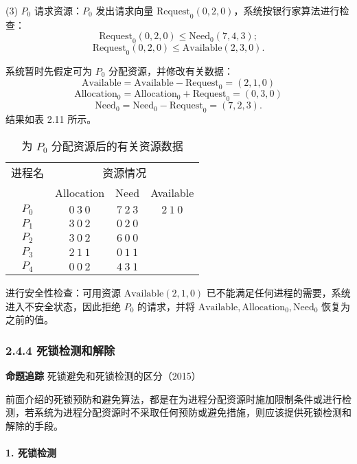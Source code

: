 \documentclass{ctexbook}
\begin{document}
		(3) $P_0$ 请求资源：$P_0$ 发出请求向量 $\text{Request}_0(0, 2, 0)$，系统按银行家算法进行检查：
		\[ 
		\text{Request}_0(0, 2, 0) \leq \text{Need}_0(7, 4, 3);
		\]
		\[ 
		\text{Request}_0(0, 2, 0) \leq \text{Available}(2, 3, 0).
		\]
		
		系统暂时先假定可为 $P_0$ 分配资源，并修改有关数据：
		\[ 
		\text{Available} = \text{Available} - \text{Request}_0 = (2, 1, 0)
		\]
		\[ 
		\text{Allocation}_0 = \text{Allocation}_0 + \text{Request}_0 = (0, 3, 0)
		\]
		\[ 
		\text{Need}_0 = \text{Need}_0 - \text{Request}_0 = (7, 2, 3).
		\]
		结果如表 2.11 所示。
		
		\begin{table}[h]
			\centering
			\caption{为 $P_0$ 分配资源后的有关资源数据}
			\label{tab:p0_allocation_after}
			\begin{tabular}{|c|c|c|c|}
				\hline
				进程名 & \multicolumn{3}{c|}{资源情况} \\
				\cline{2-4}
				& Allocation & Need & Available \\
				\hline
				$P_0$ & $0 \ 3 \ 0$ & $7 \ 2 \ 3$ & $2 \ 1 \ 0$ \\
				\hline
				$P_1$ & $3 \ 0 \ 2$ & $0 \ 2 \ 0$ & \\
				\hline
				$P_2$ & $3 \ 0 \ 2$ & $6 \ 0 \ 0$ & \\
				\hline
				$P_3$ & $2 \ 1 \ 1$ & $0 \ 1 \ 1$ & \\
				\hline
				$P_4$ & $0 \ 0 \ 2$ & $4 \ 3 \ 1$ & \\
				\hline
			\end{tabular}
		\end{table}
		
		进行安全性检查：可用资源 $\text{Available}(2, 1, 0)$ 已不能满足任何进程的需要，系统进入不安全状态，因此拒绝 $P_0$ 的请求，并将 $\text{Available}, \text{Allocation}_0, \text{Need}_0$ 恢复为之前的值。
		
		\subsubsection{2.4.4 死锁检测和解除}
		
		\textbf{命题追踪} 死锁避免和死锁检测的区分（2015）
		
		前面介绍的死锁预防和避免算法，都是在为进程分配资源时施加限制条件或进行检测，若系统为进程分配资源时不采取任何预防或避免措施，则应该提供死锁检测和解除的手段。
		
		\paragraph{1. 死锁检测}
		
\end{document}
